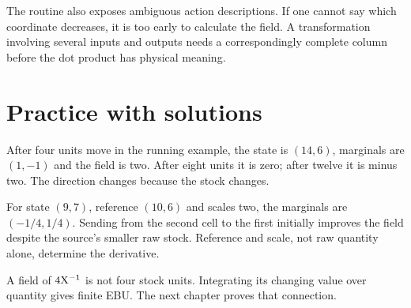 The routine also exposes ambiguous action descriptions. If one cannot say which coordinate decreases, it is too early to calculate the field. A transformation involving several inputs and outputs needs a correspondingly complete column before the dot product has physical meaning.

\section{Practice with solutions}
After four units move in the running example, the state is $(14,6)$, marginals are $(1,-1)$ and the field is two. After eight units it is zero; after twelve it is minus two. The direction changes because the stock changes.

For state $(9,7)$, reference $(10,6)$ and scales two, the marginals are $(-1/4,1/4)$. Sending from the second cell to the first initially improves the field despite the source's smaller raw stock. Reference and scale, not raw quantity alone, determine the derivative.

A field of $4\mathrm{X}^{-1}$ is not four stock units. Integrating its changing value over quantity gives finite EBU. The next chapter proves that connection.
